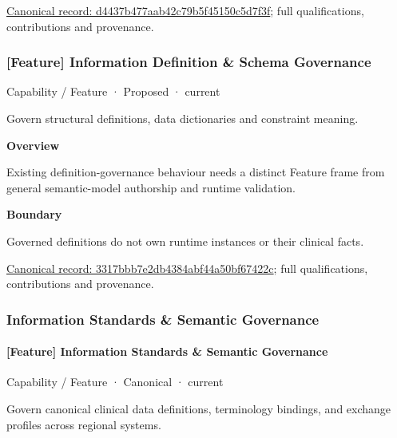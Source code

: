 {\footnotesize \href{../../../../continuum/strategy/capability/feature/d4437b477aab42c79b5f45150c5d7f3f.md}{Canonical record: d4437b477aab42c79b5f45150c5d7f3f}; full qualifications, contributions and provenance.}\par
\subsubsection{[Feature] Information Definition \& Schema Governance}

\label{element:3317bbb7e2db4384abf44a50bf67422c}
{\small Capability / Feature · Proposed · current}\par

Govern structural definitions, data dictionaries and constraint meaning.



\textbf{Overview}



Existing definition-governance behaviour needs a distinct Feature frame from general semantic-model authorship and runtime validation.



\textbf{Boundary}



Governed definitions do not own runtime instances or their clinical facts.


{\footnotesize \href{../../../../continuum/strategy/capability/feature/3317bbb7e2db4384abf44a50bf67422c.md}{Canonical record: 3317bbb7e2db4384abf44a50bf67422c}; full qualifications, contributions and provenance.}\par
\subsubsection{Information Standards \& Semantic Governance}

\paragraph{[Feature] Information Standards \& Semantic Governance}

\label{element:af5d5249302f47ebb393c91afcc60392}
{\small Capability / Feature · Canonical · current}\par

Govern canonical clinical data definitions, terminology bindings, and exchange profiles across regional systems.



